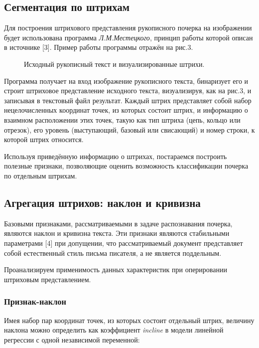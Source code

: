 \documentclass{article}
\begin{document}
\subsection{Сегментация по штрихам}
Для построения штрихового представления рукописного почерка на изображении будет использована программа \emph{Л.М.Местецкого}, принцип работы которой описан в источнике [3].
Пример работы программы отражён на рис.3. 

\begin{figure}[h]
\begin{minipage}[h]{1\linewidth}
\end{minipage}
\vfill
\vspace{0.5cm}
\begin{minipage}[h]{1\linewidth}
\end{minipage}
\caption{Исходный рукописный текст и визуализированные штрихи.}
\end{figure}

Программа получает на вход изображение рукописного текста, бинаризует его и строит штриховое представление исходного текста, визуализируя, как на рис.3, и записывая в текстовый файл результат. Каждый штрих представляет собой набор нецелочисленных координат точек, из которых состоит штрих, и информацию о взаимном расположении этих точек, такую как тип штриха (цепь, кольцо или отрезок), его уровень (выступающий, базовый или свисающий) и номер строки, к которой штрих относится. 

Используя приведённую информацию о штрихах, постараемся построить полезные признаки, позволяющие оценить возможность классификации почерка по отдельным штрихам.

\subsection{Агрегация штрихов: наклон и кривизна}
Базовыми признаками, рассматриваемыми в задаче распознавания почерка, являются наклон и кривизна текста. Эти признаки являются стабильными параметрами [4] при допущении, что рассматриваемый документ представляет собой естественный стиль письма писателя, а не является поддельным. 

Проанализируем применимость данных характеристик при оперировании штриховым представлением. 
\subsubsection{Признак-наклон}
Имея набор пар координат точек, из которых состоит отдельный штрих, величину наклона можно определить как коэффициент \emph{incline} в модели линейной регрессии с одной независимой переменной:
\end{document}
